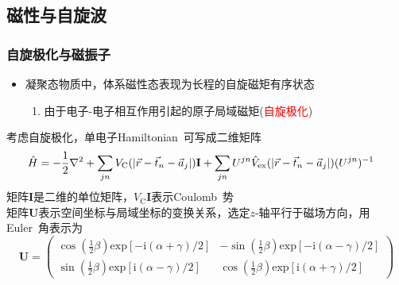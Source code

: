 \documentclass[cjk,slidestop,compress,mathserif,blue]{beamer}
\begin{document}
\subsection{磁性与自旋波}
\frame
{
	\frametitle{自旋极化与磁振子}
	\begin{itemize}
		\item 凝聚态物质中，体系磁性态表现为长程的自旋磁矩有序状态
			\begin{enumerate}
				\item 由于电子-电子相互作用引起的原子局域磁矩(\textcolor{red}{自旋极化})
			\end{enumerate}
	\end{itemize}
		考虑自旋极化，单电子\textrm{Hamiltonian~}可写成二维矩阵
			\begin{displaymath}
				\hspace*{-10pt}\hat H=-\frac12\nabla^2+\sum_{jn}V_{\mathrm C}(|\vec r-\vec t_n-\vec a_j|)\mathbf{I}+\sum_{jn}U^{jn}\hat{V}_{\mathrm{ex}}(|\vec r-\vec t_n-\vec a_j|)(U^{jn})^{-1}
			\end{displaymath}
			矩阵$\mathbf{I}$是二维的单位矩阵，$V_{\mathrm{C}}\mathbf{I}$表示\textrm{Coulomb~}势\\
			矩阵$\mathbf{U}$表示空间坐标与局域坐标的变换关系，选定$z$-轴平行于磁场方向，用\textrm{Euler~}角表示为
			\begin{displaymath}
				\mathbf{U}=\left(
				\begin{matrix}
					\cos(\frac12\beta)\mathrm{exp}[-\mathrm{i}(\alpha+\gamma)/2] &-\sin(\frac12\beta)\mathrm{exp}[-\mathrm{i}(\alpha-\gamma)/2]\\
					\sin(\frac12\beta)\mathrm{exp}[\mathrm{i}(\alpha-\gamma)/2] &\cos(\frac12\beta)\mathrm{exp}[\mathrm{i}(\alpha+\gamma)/2]
				\end{matrix}\right)
			\end{displaymath}
		}
\end{document}
